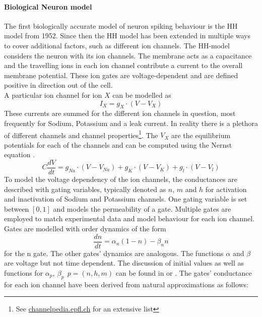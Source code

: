 	\paragraph{Biological Neuron model}
	The first biologically accurate model of neuron spiking behaviour is the \ac{HH} model from 1952\cite{hodgkin_currents_1952}. Since then the \ac{HH} model has been extended in multiple ways to cover additional factors, such as different ion channels. The \ac{HH}-model considers the neuron with its ion channels. The membrane acts as a capacitance and the travelling ions in each ion channel contribute a current to the overall membrane potential. These ion gates are voltage-dependent and are defined positive in direction out of the cell.\\
	A particular ion channel for ion $X$ can be modelled as
	\begin{equation}
	I_X= g_X \cdot (V-V_X)
	\end{equation}
	These currents are summed for the different ion channels in question, most frequently for Sodium, Potassium and a leak current. In reality there is a plethora of different channels and channel properties\footnote{See  \url{channelpedia.epfl.ch} for an extensive list}. The $V_X$ are the equilibrium potentials for each of the channels and can be computed using the Nernst equation \cite{johnston_foundations_1995}.
	\begin{equation}
	C \frac{dV}{dt} = g_{Na} \cdot (V-V_{Na}) + g_K \cdot (V-V_K) + g_l \cdot (V-V_l)
	\end{equation}
	To model the voltage dependency of the ion channels, the conductances are described with gating variables, typically denoted as $n$, $m$ and $h$ for activation and inactivation of Sodium and Potassium channels. One gating variable is set between $[0,1]$ and models the permeability of a gate. Multiple gates are employed to match experimental data and model behaviour for each ion channel.\\
	Gates are modelled with order dynamics of the form
	\begin{equation}
	\frac{dn}{dt} = \alpha_n(1-n) - \beta_n n
	\end{equation}
	for the n gate. The other gates' dynamics are analogous. The functions $\alpha$ and $\beta$ are voltage but not time dependent. The discussion of initial values as well as functions for $\alpha_p,\ \beta_p\ \ p = (n,h,m)$ can be found in \cite{hodgkin_quantitative_1952} or \cite{johnston_foundations_1995}. The gates' conductance for each ion channel have been derived from natural approximations as follows:

